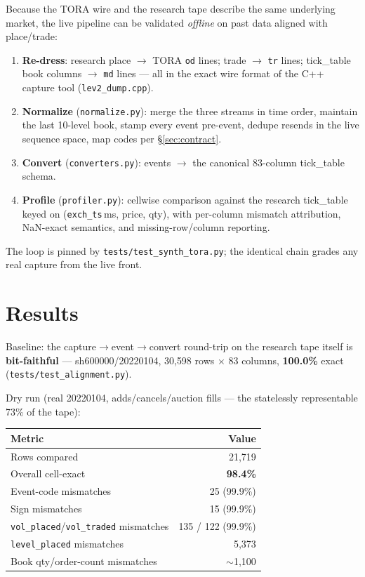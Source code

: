 \documentclass[11pt,a4paper]{article}
\begin{document}
Because the TORA wire and the research tape describe the same underlying
market, the live pipeline can be validated \emph{offline} on past data
aligned with place/trade:

\begin{enumerate}
  \item \textbf{Re-dress}: research place $\rightarrow$ TORA \texttt{od}
        lines; trade $\rightarrow$ \texttt{tr} lines; tick\_table book
        columns $\rightarrow$ \texttt{md} lines --- all in the exact wire
        format of the C++ capture tool (\texttt{lev2\_dump.cpp}).
  \item \textbf{Normalize} (\texttt{normalize.py}): merge the three streams
        in time order, maintain the last 10-level book, stamp every event
        pre-event, dedupe resends in the live sequence space, map codes
        per \S\ref{sec:contract}.
  \item \textbf{Convert} (\texttt{converters.py}): events $\rightarrow$ the
        canonical 83-column tick\_table schema.
  \item \textbf{Profile} (\texttt{profiler.py}): cellwise comparison against
        the research tick\_table keyed on
        (\texttt{exch\_ts}\,ms, price, qty), with per-column mismatch
        attribution, NaN-exact semantics, and missing-row/column reporting.
\end{enumerate}

The loop is pinned by \texttt{tests/test\_synth\_tora.py}; the identical
chain grades any real capture from the live front.

\section{Results}
\label{sec:results}

Baseline: the capture$\rightarrow$event$\rightarrow$convert round-trip on the
research tape itself is \textbf{bit-faithful} --- sh600000/20220104,
30{,}598 rows $\times$ 83 columns, \textbf{100.0\%} exact
(\texttt{tests/test\_alignment.py}).

Dry run (real 20220104, adds/cancels/auction fills --- the statelessly
representable 73\% of the tape):

\begin{center}
\begin{tabular}{lr}
\toprule
Metric & Value \\
\midrule
Rows compared & 21{,}719 \\
Overall cell-exact & \textbf{98.4\%} \\
Event-code mismatches & 25 \quad (99.9\%) \\
Sign mismatches & 15 \quad (99.9\%) \\
\texttt{vol\_placed}/\texttt{vol\_traded} mismatches & 135 / 122 \quad (99.9\%) \\
\texttt{level\_placed} mismatches & 5{,}373 \\
Book qty/order-count mismatches & $\sim$1{,}100 \\
\bottomrule
\end{tabular}
\end{center}
\end{document}
